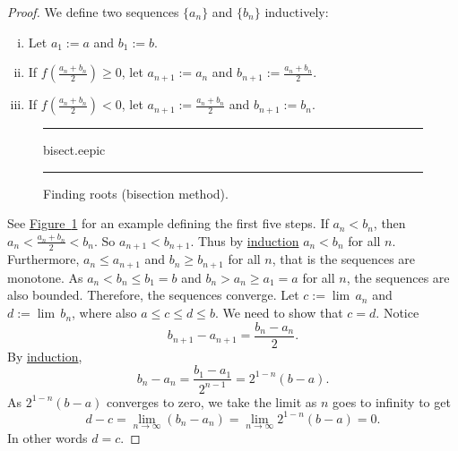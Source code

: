 \documentclass[12pt]{book}
\newenvironment{myfigureht}{%
\begin{figure}[h!t]
\noindent\rule{\textwidth}{0.4pt}\vspace{12pt}\par\centering}%
{\par\noindent\rule{\textwidth}{0.4pt}
\end{figure}}
\newcommand{\abs}[1]{\left\lvert {#1} \right\rvert}
\theoremstyle{plain}
\theoremstyle{remark}
\theoremstyle{definition}
\theoremstyle{exercise}
\theoremstyle{example}
\newcommand{\figureref}[1]{\hyperref[#1]{Figure~\ref*{#1}}}
\begin{document}
\begin{proof}
We define two sequences $\{ a_n \}$
and $\{ b_n \}$ inductively:
\begin{enumerate}[(i)]
\item Let $a_1 := a$ and $b_1 := b$.
\item If $f\left(\frac{a_n+b_n}{2}\right) \geq 0$, let $a_{n+1} := a_n$ and
$b_{n+1} := \frac{a_n+b_n}{2}$.
\item If $f\left(\frac{a_n+b_n}{2}\right) < 0$, let $a_{n+1} := \frac{a_n+b_n}{2}$ and
$b_{n+1} := b_n$.
\end{enumerate}
\begin{myfigureht}
{bisect.eepic}
\caption{Finding roots (bisection method).\label{bisectfig}}
\end{myfigureht}
See \figureref{bisectfig} for an example defining the first five steps.
If $a_n < b_n$, then $a_n < \frac{a_n+b_n}{2} < b_n$.  So
$a_{n+1} < b_{n+1}$.
Thus by \hyperref[induction:thm]{induction} $a_n < b_n$ for all $n$.
Furthermore, $a_n \leq a_{n+1}$ and 
$b_n \geq b_{n+1}$ for all $n$, that is the sequences are monotone.
As $a_n < b_n \leq b_1 = b$ and 
$b_n > a_n \geq a_1 = a$ for all $n$,
the sequences are also bounded.  Therefore, the
sequences converge.  Let $c := \lim\, a_n$ and $d := \lim\, b_n$,
where also $a \leq c \leq d \leq b$.  We need
to show that $c=d$.
Notice
\begin{equation*}
b_{n+1} - a_{n+1} = \frac{b_n-a_n}{2}.
\end{equation*}
By \hyperref[induction:thm]{induction},
\begin{equation*}
b_n - a_n = \frac{b_1-a_1}{2^{n-1}} = 2^{1-n} (b-a) .
\end{equation*}
As $2^{1-n}(b-a)$ converges to zero, we take the limit as $n$ goes to
infinity to get
\begin{equation*}
d-c = \lim_{n\to\infty} (b_n - a_n) =
\lim_{n\to\infty} 2^{1-n} (b-a) = 0.
\end{equation*}
In other words $d=c$.


\end{proof}
\end{document}
